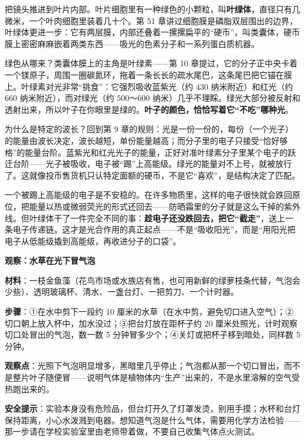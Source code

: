 把镜头推进到叶片内部。叶片细胞里有一种绿色的小颗粒，叫\textbf{叶绿体}，直径只有几微米，一个叶肉细胞里装着几十个。第 51 章讲过细胞膜是磷脂双层围出的边界，叶绿体更进一步：它有两层膜，内部还叠着一摞摞扁平的“硬币”，叫类囊体，硬币膜上密密麻麻嵌着两类东西——吸光的色素分子和一系列蛋白质机器。

绿色从哪来？类囊体膜上的主角是叶绿素——第 10 章提过，它的分子正中央卡着一个镁原子，周围一圈碳氮环，拖着一条长长的疏水尾巴，这条尾巴把它锚在膜上。叶绿素对光非常“挑食”：它强烈吸收蓝紫光（约 $430$ 纳米附近）和红光（约 $660$ 纳米附近），而对绿光（约 $500$～$600$ 纳米）几乎不理睬。绿光大部分被反射和透射出来，所以叶子在你眼里是绿的。\textbf{叶子的颜色，恰恰写着它“不吃”哪种光}。

为什么是特定的波长？回到第 9 章的规则：光是一份一份的，每份（一个光子）的能量由波长决定，波长越短，单份能量越高；而分子里的电子只接受“恰好够格”的能量台阶。蓝紫光和红光光子的能量，正好对准叶绿素分子里某个电子的跃迁台阶——光子被吸收，电子被“踢”上高能级。绿光的能量对不上号，就被放行了。这就像投币售货机只认特定面额的硬币，不是它“喜欢”，是结构决定了匹配。

一个被踢上高能级的电子是不安稳的。在许多物质里，这样的电子很快就会跌回原位，把能量以热或微弱荧光的形式还回去——防晒霜里的分子就是这么干掉的紫外线。但叶绿体干了一件完全不同的事：\textbf{趁电子还没跌回去，把它“截走”}，送上一条电子传递链。这才是光合作用的真正起点——不是“吸收阳光”，而是“用阳光把电子从低能级撬到高能级，再收进分子的口袋”。

\begin{shiyan}
\textbf{观察：水草在光下冒气泡}

\textbf{材料}：一枝金鱼藻（花鸟市场或水族店有售，也可用新鲜的绿萝枝条代替，气泡会少些）、透明玻璃杯、清水、一盏台灯、一把剪刀、一个计时器。

\textbf{步骤}：①在水中剪下一段约 10 厘米的水草（在水中剪，避免切口进入空气）；②切口朝上放入杯中，加水没过；③把台灯放在距杯子约 20 厘米处照光，计时观察切口处冒出的气泡，数一数 5 分钟冒多少个；④关灯或把杯子移到暗处，同样数 5 分钟。

\textbf{观察点}：光照下气泡明显增多，黑暗里几乎停止；气泡都从那一个切口冒出，而不是整片叶子随便冒——说明气体是植物体内“生产”出来的，不是水里溶解的空气受热跑出来的。

\textbf{安全提示}：实验本身没有危险品，但台灯开久了灯罩发烫，别用手摸；水杯和台灯保持距离，小心水泼溅到电器。想知道气泡是什么气体，需要用化学方法检验——那一步请在学校实验室里由老师带着做，不要自己收集气体点火测试。
\end{shiyan}

